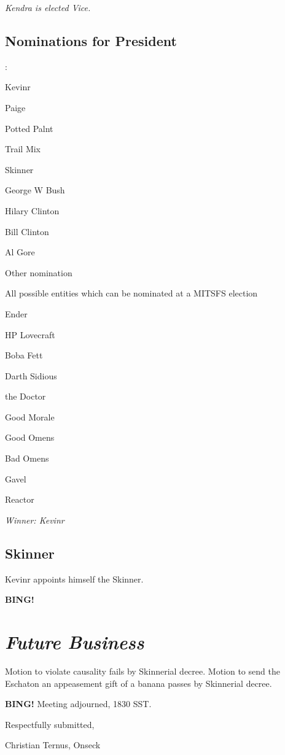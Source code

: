 \documentclass[10pt]{article}
\newcommand{\bing}{{\bf BING!} }
\newcommand{\goto}[1]{\bing \vskip 12pt \section*{{\em{#1}}}}
\begin{document}
\emph{Kendra is elected Vice.}

\subsection*{Nominations for President}:

Kevinr

Paige

Potted Palnt

Trail Mix

Skinner

George W Bush

Hilary Clinton

Bill Clinton

Al Gore

Other nomination

All possible entities which can be nominated at a MITSFS election

Ender

HP Lovecraft

Boba Fett

Darth Sidious

the Doctor

Good Morale

Good Omens

Bad Omens

Gavel

Reactor

\emph{Winner: Kevinr}

\subsection*{Skinner}
Kevinr appoints himself the Skinner.

\goto{Future Business}

Motion to violate causality fails by Skinnerial decree.
Motion to send the Eschaton an appeasement gift of a banana passes by Skinnerial decree.

\bing
\noindent
Meeting adjourned, 1830 SST.

\vspace{18pt}

\centerline{Respectfully submitted,}
\centerline{Christian Ternus, Onseck}
\end{document}
